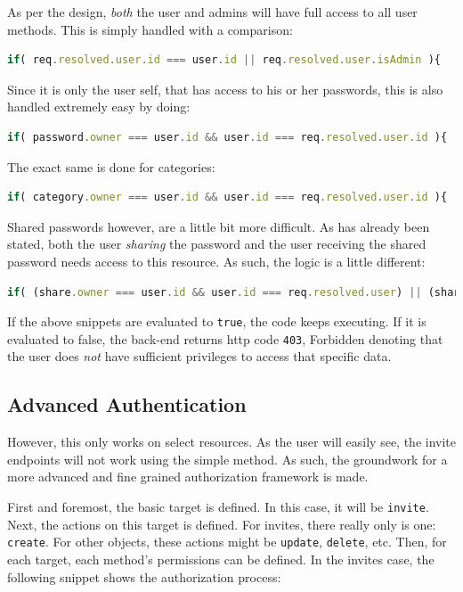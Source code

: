 			As per the design, \emph{both} the user and admins will have full access to all user methods. This is simply handled with a comparison:
			\begin{lstlisting}[gobble=16,language=JavaScript]
                if( req.resolved.user.id === user.id || req.resolved.user.isAdmin ){
			\end{lstlisting}

			Since it is only the user self, that has access to his or her passwords, this is also handled extremely easy by doing:
			\begin{lstlisting}[gobble=16,language=JavaScript]
                if( password.owner === user.id && user.id === req.resolved.user.id ){
			\end{lstlisting}
			The exact same is done for categories:
			\begin{lstlisting}[gobble=16,language=JavaScript]
                if( category.owner === user.id && user.id === req.resolved.user.id ){
			\end{lstlisting}

			Shared passwords however, are a little bit more difficult. As has already been stated, both the user \emph{sharing} the password and the user receiving the shared password needs access to this resource. As such, the logic is a little different:
			\begin{lstlisting}[gobble=16,language=JavaScript]
                if( (share.owner === user.id && user.id === req.resolved.user) || (share.origin_owner === user.id && user.id === req.resolved.user)){
			\end{lstlisting}
		
			If the above snippets are evaluated to \verb=true=, the code keeps executing. If it is evaluated to false, the back-end returns http code \verb=403=, Forbidden denoting that the user does \emph{not} have sufficient privileges to access that specific data.

		\subsection{Advanced Authentication}
			However, this only works on select resources. As the user will easily see, the invite endpoints will not work using the simple method. As such, the groundwork for a more advanced and fine grained authorization framework is made.

			First and foremost, the basic target is defined. In this case, it will be \verb=invite=. Next, the actions on this target is defined. For invites, there really only is one: \verb=create=. For other objects, these actions might be \verb=update=, \verb=delete=, etc. Then, for each target, each method's permissions can be defined. In the invites case, the following snippet shows the authorization process:

